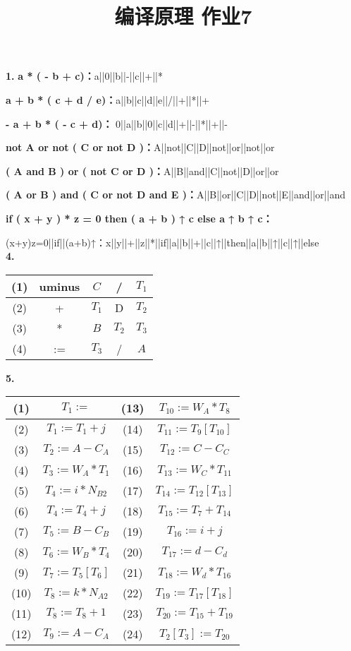 \documentclass{article}
\title{编译原理 作业7}
\author{}
\date{}
\begin{document}
\textbf{1.}
\noindent
\textbf{a * ( - b + c)：}a||0||b||-||c||+||*

\textbf{a + b * ( c + d / e)：}a||b||c||d||e||/||+||*||+

\textbf{- a + b * ( - c + d)：} 0||a||b||0||c||d||+||-||*||+||-

\textbf{not A or not ( C or not D )：}A||not||C||D||not||or||not||or

\textbf{( A and B ) or ( not C or D )：}A||B||and||C||not||D||or||or 

\textbf{( A or B ) and ( C or not D and E )：}A||B||or||C||D||not||E||and||or||and

\textbf{if ( x + y ) * z = 0 then ( a + b ) ↑ c else a ↑ b ↑ c：}

(x+y)\*z=0||if||(a+b)↑：x||y||+||z||*||if||a||b||+||c||↑||then||a||b||↑||c||↑||else\\

\textbf{4.}
\begin{table}[h]
    \centering
    \begin{tabular}{|c|c|c|c|c|}
        \hline
        (1) & uminus & $C$ & / & $T_1$\\
        \hline
        (2) & + & $T_1$ & D & $T_2$\\
        \hline
        (3) & * & $B$ & $T_2$ & $T_3$\\
        \hline
        (4) & := & $T_3$ & / &$A$\\
        \hline
    \end{tabular}
\end{table}

\textbf{5.}
\begin{table}[h]
    \centering
    \begin{tabular}{|c|c|c|c|}
        \hline
        (1) & $T_1:=$ & (13) & $T_{10}:=W_A*T_8$\\
        \hline
        (2) & $T_1:=T_1+j$ & (14) & $T_{11}:=T_9[T_{10}]$\\
        \hline
        (3) & $T_2:=A-C_A$ & (15) & $T_{12}:=C-C_C$\\ 
        \hline
        (4) & $T_3:=W_A*T_1$ & (16) & $T_{13}:=W_C*T_{11}$\\ 
        \hline
        (5) & $T_4:=i*N_{B2}$ & (17) & $T_{14}:=T_{12}[T_{13}]$\\ 
        \hline
        (6) & $T_4:=T_4+j$ & (18) & $T_{15}:=T_7+T_{14}$\\ 
        \hline
        (7) & $T_5:=B-C_B$ & (19) & $T_{16}:=i+j$\\ 
        \hline
        (8) & $T_6:=W_B*T_4$ & (20) & $T_{17}:=d-C_d$\\ 
        \hline
        (9) & $T_7:=T_5[T_6]$ & (21) & $T_{18}:=W_d*T_{16}$\\ 
        \hline
        (10) & $T_8:=k*N_{A2}$ & (22) & $T_{19}:=T_{17}[T_{18}]$\\ 
        \hline
        (11) & $T_8:=T_8+1$ & (23) & $T_{20}:=T_{15}+T_{19}$\\ 
        \hline
        (12) & $T_9:=A-C_A$ & (24) & $T_2[T_3]:=T_{20}$\\
        \hline
    \end{tabular}
\end{table}
\end{document}
